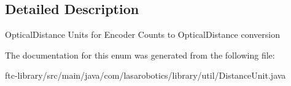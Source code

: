 \subsection{Detailed Description}
Optical\+Distance Units for Encoder Counts to Optical\+Distance conversion 

The documentation for this enum was generated from the following file\+:\begin{DoxyCompactItemize}
\item 
ftc-\/library/src/main/java/com/lasarobotics/library/util/Distance\+Unit.\+java\end{DoxyCompactItemize}
